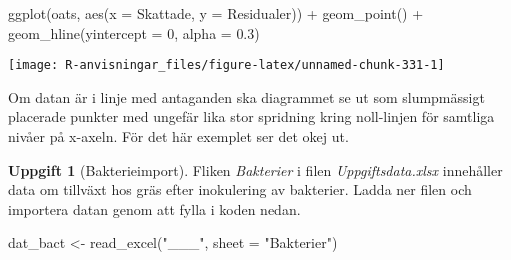 \documentclass[
]{book}
\newenvironment{Shaded}{\begin{snugshade}}{\end{snugshade}}
\newcommand{\AttributeTok}[1]{\textcolor[rgb]{0.77,0.63,0.00}{#1}}
\newcommand{\DecValTok}[1]{\textcolor[rgb]{0.00,0.00,0.81}{#1}}
\newcommand{\FloatTok}[1]{\textcolor[rgb]{0.00,0.00,0.81}{#1}}
\newcommand{\FunctionTok}[1]{\textcolor[rgb]{0.00,0.00,0.00}{#1}}
\newcommand{\NormalTok}[1]{#1}
\newcommand{\OtherTok}[1]{\textcolor[rgb]{0.56,0.35,0.01}{#1}}
\newcommand{\SpecialCharTok}[1]{\textcolor[rgb]{0.00,0.00,0.00}{#1}}
\newcommand{\StringTok}[1]{\textcolor[rgb]{0.31,0.60,0.02}{#1}}
\theoremstyle{definition}
\theoremstyle{definition}
\theoremstyle{definition}
\newtheorem{exercise}{Uppgift}[chapter]
\theoremstyle{definition}
\theoremstyle{remark}
\begin{document}
\begin{Shaded}
\begin{Highlighting}[]
\FunctionTok{ggplot}\NormalTok{(oats, }\FunctionTok{aes}\NormalTok{(}\AttributeTok{x =}\NormalTok{ Skattade, }\AttributeTok{y =}\NormalTok{ Residualer)) }\SpecialCharTok{+}
  \FunctionTok{geom\_point}\NormalTok{() }\SpecialCharTok{+}
  \FunctionTok{geom\_hline}\NormalTok{(}\AttributeTok{yintercept =} \DecValTok{0}\NormalTok{, }\AttributeTok{alpha =} \FloatTok{0.3}\NormalTok{)}
\end{Highlighting}
\end{Shaded}

\begin{center}\texttt{[image: R-anvisningar\_files/figure-latex/unnamed-chunk-331-1]} \end{center}

Om datan är i linje med antaganden ska diagrammet se ut som slumpmässigt placerade punkter med ungefär lika stor spridning kring noll-linjen för samtliga nivåer på x-axeln. För det här exemplet ser det okej ut.

\begin{exercise}[Bakterieimport]

Fliken \emph{Bakterier} i filen \emph{Uppgiftsdata.xlsx} innehåller data om tillväxt hos gräs efter inokulering av bakterier. Ladda ner filen och importera datan genom att fylla i koden nedan.

\begin{Shaded}
\begin{Highlighting}[]
\NormalTok{dat\_bact }\OtherTok{\textless{}{-}} \FunctionTok{read\_excel}\NormalTok{(}\StringTok{"\_\_\_"}\NormalTok{, }\AttributeTok{sheet =} \StringTok{"Bakterier"}\NormalTok{)}
\end{Highlighting}
\end{Shaded}

\end{exercise}
\end{document}
